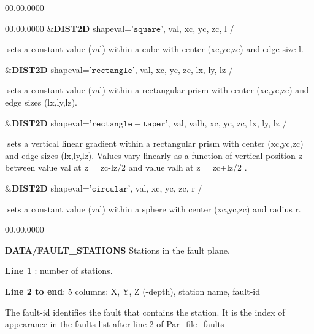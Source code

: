 \begin{lyxlist}{00.00.0000}
\begin{lyxlist}{00.00.0000}
\&\textbf{DIST2D} shapeval='$\mathtt{square}$', val, xc, yc, zc, l /


$\;$sets a constant value (val) within a cube with center (xc,yc,zc)
and edge size l.


\&\textbf{DIST2D} shapeval='$\mathtt{rectangle}$', val, xc, yc, zc,
lx, ly, lz /


$\;$sets a constant value (val) within a rectangular prism with center
(xc,yc,zc) and edge sizes (lx,ly,lz).


\&\textbf{DIST2D} shapeval='$\mathtt{rectangle-taper}$', val, valh,
xc, yc, zc, lx, ly, lz /


$\;$sets a vertical linear gradient within a rectangular prism with
center (xc,yc,zc) and edge sizes (lx,ly,lz). Values vary linearly
as a function of vertical position z between value val at z = zc-lz/2
and value valh at z = zc+lz/2 .


\&\textbf{DIST2D} shapeval='$\mathtt{circular}$', val, xc, yc, zc, r
/


$\;$sets a constant value (val) within a sphere with center (xc,yc,zc)
and radius r. \\


\end{lyxlist}
\end{lyxlist}

\begin{lyxlist}{00.00.0000}
\item [{\textbf{DATA/FAULT\_STATIONS}}] Stations in the fault plane.


\textbf{Line 1} : number of stations.


\textbf{Line 2 to end}: 5 columns: X, Y, Z (-depth), station name,
fault-id


The fault-id identifies the fault that contains the station. It is
the index of appearance in the faults list after line 2 of Par\_file\_faults

\end{lyxlist}

